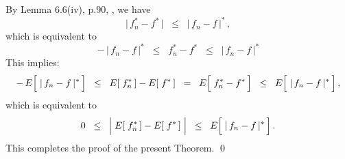 \vskip 0.5cm
\noindent
By Lemma 6.6(iv), p.90, \cite{Kosorok2008}, we have
\begin{equation*}
\vert\,f_{n}^{*} - f^{*}\,\vert
\;\; \leq \;\;
	\vert\,f_{n} - f\,\vert^{*}\,,
\end{equation*}
which is equivalent to
\begin{equation*}
-\,\vert\,f_{n} - f\,\vert^{*}
\;\; \leq \;\;
	f_{n}^{*} - f^{*}
\;\; \leq \;\;
	\vert\,f_{n} - f\,\vert^{*}
\end{equation*}
This implies:
\begin{equation*}
-\,E\!\left[\;\vert\,f_{n} \overset{{\color{white}.}}{-} f\,\vert^{*}\,\right]
\;\; \leq \;\;
	E\!\left[\;f_{n}^{*}\,\right] \overset{{\color{white}.}}{-} E\!\left[\;f^{*}\,\right]
\;\; = \;\;
	E\!\left[\;f_{n}^{*} \overset{{\color{white}.}}{-} f^{*}\,\right]
\;\; \leq \;\;
	E\!\left[\;\vert\,f_{n} \overset{{\color{white}.}}{-} f\,\vert^{*}\,\right],
\end{equation*}
which is equivalent to
\begin{equation*}
0
\;\; \leq \;\;
	\left\vert\;
		E\!\left[\;f_{n}^{*}\,\right] \overset{{\color{white}.}}{-} E\!\left[\;f^{*}\,\right]
	\;\right\vert
\;\; \leq \;\;
	E\!\left[\;\vert\,f_{n} \overset{{\color{white}.}}{-} f\,\vert^{*}\,\right].
\end{equation*}
This completes the proof of the present Theorem.
\qed


\renewcommand{\theenumi}{\roman{enumi}}
\renewcommand{\labelenumi}{\textnormal{(\theenumi)}$\;\;$}

